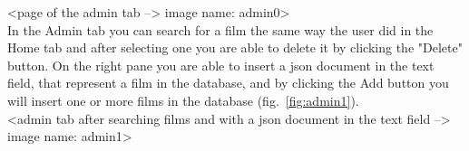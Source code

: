 \documentclass[a4paper, oneside]{article}
\begin{document}
<page of the admin tab --> image name: admin0>\\

In the Admin tab you can search for a film the same way the user did in the Home tab and after selecting one you are able to delete it by clicking the "Delete" button. On the right pane you are able to insert a json document in the text field, that represent a film in the database, and by clicking the Add button you will insert one or more films in the database (fig.~\ref{fig:admin1}).\\ 

<admin tab after searching films and with a json document in the text field --> image name: admin1>
\end{document}
